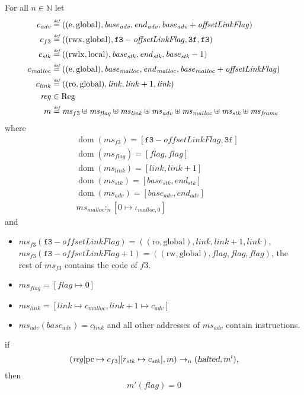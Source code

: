 \documentclass[a4paper]{article}
\newcommand{\update}[2]{[#1 \mapsto #2]}
\newcommand{\defeq}{\stackrel{\textit{\tiny{def}}}{=}}
\DeclareMathOperator{\dom}{dom}
\newcommand{\var}[1]{\mathit{#1}}
\newcommand{\hs}{\var{ms}}
\newcommand{\ms}{\hs}
\newcommand{\pcreg}{\mathrm{pc}}
\newcommand{\start}{\var{base}}
\newcommand{\addrend}{\var{end}}
\newcommand{\reg}{\var{reg}}
\newcommand{\heap}{\var{mem}}
\newcommand{\adv}{\var{adv}}
\newcommand{\link}{\var{link}}
\newcommand{\stk}{\var{stk}}
\newcommand{\flag}{\var{flag}}
\newcommand{\olf}{\var{offsetLinkFlag}}
\newcommand{\halted}{\textsl{halted}}
\newcommand{\heapSat}[3][\heap]{#1 :_{#2} #3}
\newcommand{\codelabel}[1]{\mathit{#1}}
\newcommand{\malloc}{\codelabel{malloc}}
\newcommand{\plaindom}[1]{\mathrm{#1}}
\newcommand{\Regs}{\plaindom{Reg}}
\newcommand{\nats}{\mathbb{N}}
\newcommand{\plainperm}[1]{\mathrm{#1}}
\newcommand{\readonly}{\plainperm{ro}}
\newcommand{\readwrite}{\plainperm{rw}}
\newcommand{\entry}{\plainperm{e}}
\newcommand{\rwx}{\plainperm{rwx}}
\newcommand{\rwlx}{\plainperm{rwlx}}
\newcommand{\local}{\plainperm{local}}
\newcommand{\glob}{\plainperm{global}}
\newcommand{\step}[1][]{\rightarrow_{#1}}
\begin{document}
\begin{lemma}
  \label{lem:correctness-f3}
  For all $n \in \nats$
  let
  \begin{align*}
    c_{\var{adv}} & \defeq ((\entry,\glob),\start_{\adv},\addrend_{\adv},\start_{\adv}+\olf) \\
    c_{f3} & \defeq ((\rwx,\glob),\mathtt{f3}-\olf,\mathtt{3f},\mathtt{f3}) \\
    c_{\var{stk}} & \defeq ((\rwlx,\local),\start_\stk,\addrend_\stk,\start_\stk-1) \\
    c_\malloc & \defeq ((\entry,\glob),\start_\malloc,\addrend_\malloc,\start_\malloc+\olf) \\
    c_\link & \defeq ((\readonly,\glob),\link,\link+1,\link) \\
    \reg & \in \Regs \\
    m & \defeq \hs_{f3} \uplus 
        \hs_\flag \uplus                
        \ms_{\var{link}} \uplus 
        \hs_\adv \uplus 
        \ms_{\malloc} \uplus 
        \ms_{\var{stk}} \uplus
        \ms_{\var{frame}} 
  \end{align*}
  where 
  \begin{align*}
    &\dom(\hs_{f3}) = [\mathtt{f3}-\olf,\mathtt{3f}] \\
    &\dom(\hs_\flag) = [\flag,\flag] \\
    &\dom(\ms_\link) = [\link,\link+1]\\
    &\dom(\ms_\stk) = [\start_\stk, \addrend_\stk]\\
    &\dom(\hs_{\adv}) = [\start_\adv,\addrend_\adv] \\
    &\heapSat[\hs_{\malloc}]{n}{[0 \mapsto \iota_{\malloc,0}]}
  \end{align*}
  and
  \begin{itemize}
  \item $\ms_{f3}(\mathtt{f3}-\olf) = ((\readonly,\glob),\link,\link+1,\link)$, $\ms_{f3}(\mathtt{f3}-\olf+1) = ((\readwrite,\glob),\flag,\flag,\flag)$, the rest of $\hs_{f3}$ contains the code of $f3$.
  \item $\ms_\flag = [\flag \mapsto 0]$
  \item $\ms_{\var{link}} = [\var{link} \mapsto c_\malloc, \var{link} + 1 \mapsto c_\adv]$
  \item $\hs_\adv(\start_\adv) = c_\link$ and all other addresses of $\ms_\adv$ contain instructions.
  \end{itemize}
  if 
  \[
    (\reg\update{\pcreg}{c_{f3}}\update{r_\stk}{c_\stk},m) \step[n] (\halted,m'),
  \]
  then
  \[
    m'(\flag) = 0
  \]  
\end{lemma}
\end{document}
